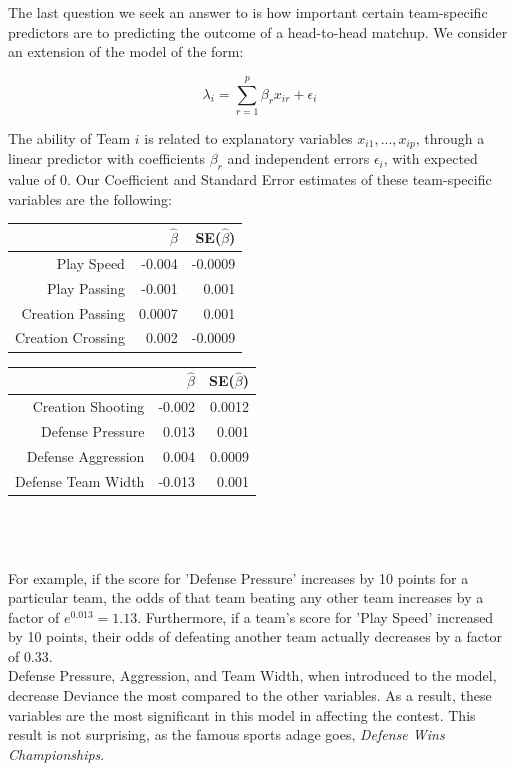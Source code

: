 \documentclass{article}
\begin{document}
 The last question we seek an answer to is how important certain team-specific predictors are to predicting the outcome of a head-to-head matchup. We consider an extension of the model of the form:
 
 $$\lambda_i = \displaystyle\sum_{r=1}^{p} \beta_r x_{ir} + \epsilon_i$$

The ability of Team $i$ is related to explanatory variables $x_{i1},...,x_{ip}$, through a linear predictor with coefficients $\beta_{r}$ and independent errors $\epsilon_i$, with expected value of 0. Our Coefficient and Standard Error estimates of these team-specific variables are the following:\\


\begin{tabular}{rrr}
  \hline
 & $\hat{\beta}$ & SE($\hat{\beta}$)\\ 
  \hline
Play Speed  & -0.004 & -0.0009 \\
Play Passing  & -0.001 & 0.001 \\
Creation Passing  & 0.0007 & 0.001 \\
Creation Crossing  & 0.002 & -0.0009 \\
   \hline
\end{tabular}
\quad
\begin{tabular}{rrr}
  \hline
 & $\hat{\beta}$ & SE($\hat{\beta}$)\\ 
  \hline
Creation Shooting & -0.002 & 0.0012 \\
Defense Pressure  & 0.013 & 0.001 \\
Defense Aggression & 0.004 & 0.0009 \\
Defense Team Width  & -0.013 & 0.001 \\
   \hline
\end{tabular}\\
\\
\\
For example, if the score for 'Defense Pressure' increases by 10 points for a particular team, the odds of that team beating any other team increases by a factor of $e^{0.013} = 1.13$. Furthermore, if a team's score for 'Play Speed' increased by 10 points, their odds of defeating another team actually decreases by a factor of 0.33.\\

Defense Pressure, Aggression, and Team Width, when introduced to the model, decrease Deviance the most compared to the other variables. As a result, these variables are the most significant in this model in affecting the contest. This result is not surprising, as the famous sports adage goes, \textit{Defense Wins Championships}.\\
\end{document}
